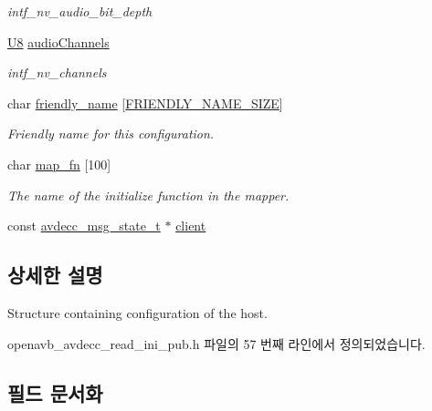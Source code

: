 \begin{DoxyCompactItemize}
\begin{DoxyCompactList}\small\item\em intf\+\_\+nv\+\_\+audio\+\_\+bit\+\_\+depth \end{DoxyCompactList}\item 
\hyperlink{openavb__types__base__pub_8h_aa63ef7b996d5487ce35a5a66601f3e73}{U8} \hyperlink{structopenavb__tl__data__cfg_aaaa0fe92c7f61a4e2353b4be8340d4a7}{audio\+Channels}
\begin{DoxyCompactList}\small\item\em intf\+\_\+nv\+\_\+channels \end{DoxyCompactList}\item 
char \hyperlink{structopenavb__tl__data__cfg_a25c82ac188182d72242fb10f0285a2bd}{friendly\+\_\+name} \mbox{[}\hyperlink{tl_2openavb__tl__pub_8h_a29d83e67ee30c78c6ed81c188a433c10}{F\+R\+I\+E\+N\+D\+L\+Y\+\_\+\+N\+A\+M\+E\+\_\+\+S\+I\+ZE}\mbox{]}
\begin{DoxyCompactList}\small\item\em Friendly name for this configuration. \end{DoxyCompactList}\item 
char \hyperlink{structopenavb__tl__data__cfg_a2db51089f2117ba4aece1285e47c220f}{map\+\_\+fn} \mbox{[}100\mbox{]}
\begin{DoxyCompactList}\small\item\em The name of the initialize function in the mapper. \end{DoxyCompactList}\item 
const \hyperlink{openavb__avdecc__read__ini__pub_8h_a23083b48075a0359e894648e78de1e98}{avdecc\+\_\+msg\+\_\+state\+\_\+t} $\ast$ \hyperlink{structopenavb__tl__data__cfg_ab98c74d1747db368639fb4a95a8546c5}{client}
\end{DoxyCompactItemize}


\subsection{상세한 설명}
Structure containing configuration of the host. 

openavb\+\_\+avdecc\+\_\+read\+\_\+ini\+\_\+pub.\+h 파일의 57 번째 라인에서 정의되었습니다.



\subsection{필드 문서화}
